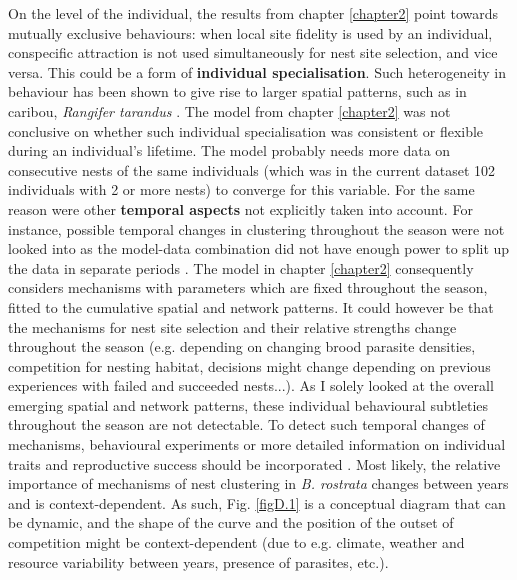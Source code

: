 \documentclass[10pt, twoside]{book} %
\begin{document}
	On the level of the individual, the results from chapter \ref{chapter2} point towards mutually exclusive behaviours: when local site fidelity is used by an individual, conspecific attraction is not used simultaneously for nest site selection, and vice versa. This could be a form of \textbf{individual specialisation}. Such heterogeneity in behaviour has been shown to give rise to larger spatial patterns, such as in caribou, \textit{Rangifer tarandus} \citep{spiegel2017, webber2020, bonar2020}. The model from chapter \ref{chapter2} was not conclusive on whether such individual specialisation was consistent or flexible during an individual's lifetime. The model probably needs more data on consecutive nests of the same individuals (which was in the current dataset 102 individuals with 2 or more nests) to converge for this variable. For the same reason were other \textbf{temporal aspects} not explicitly taken into account. For instance, possible temporal changes in clustering throughout the season were not looked into as the model-data combination did not have enough power to split up the data in separate periods \citep[e.g. as in][]{asis2014}. The model in chapter \ref{chapter2} consequently considers mechanisms with parameters which are fixed throughout the season, fitted to the cumulative spatial and network patterns. It could however be that the mechanisms for nest site selection and their relative strengths change throughout the season (e.g. depending on changing brood parasite densities, competition for nesting habitat, decisions might change depending on previous experiences with failed and succeeded nests...). As I solely looked at the overall emerging spatial and network patterns, these individual behavioural subtleties throughout the season are not detectable. To detect such temporal changes of mechanisms, behavioural experiments or more detailed information on individual traits and reproductive success should be incorporated \citep[e.g. in][]{bonar2020}. Most likely, the relative importance of mechanisms of nest clustering in \textit{B. rostrata} changes between years and is context-dependent. As such, Fig. \ref{figD.1} is a conceptual diagram that can be dynamic, and the shape of the curve and the position of the outset of competition might be context-dependent (due to e.g. climate, weather and resource variability between years, presence of parasites, etc.).\\
	
\end{document}
